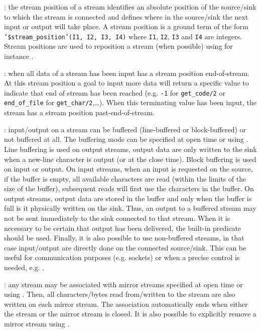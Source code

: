 : the stream position of a stream identifies an
absolute position of the source/sink to which the stream is connected and
defines where in the source/sink the next input or output will take place. A
stream position is a ground term of the form
\texttt{'\$stream\_position'(I1, I2, I3, I4)} where \texttt{I1},
\texttt{I2}, \texttt{I3} and \texttt{I4} are integers. Stream positions are
used to reposition a stream (when possible) using for instance
 .

: when all data of a stream
 has been input  has a stream position
end-of-stream. At this stream position a goal to input more data will return
a specific value to indicate that end of stream has been reached (e.g.
\texttt{-1} for \texttt{get\_code/2} or \texttt{end\_of\_file} for
\texttt{get\_char/2},\ldots). When this terminating value has been input, the
stream has a stream position past-end-of-stream.

: input/output on a stream can be buffered
(line-buffered or block-buffered) or not buffered at all. The buffering mode
can be specified at open time or using 
. Line buffering is used on output streams,
output data are only written to the sink when a new-line character is output
(or at the close time). Block buffering is used on input or output. On input
streams, when an input is requested on the source, if the buffer is empty,
all available characters are read (within the limits of the size of the
buffer), subsequent reads will first use the characters in the buffer. On
output streams, output data are stored in the buffer and only when the
buffer is full is it physically written on the sink. Thus, an output to a
buffered stream may not be sent immediately to the sink connected to that
stream. When it is necessary to be certain that output has been delivered,
the built-in predicate  
should be used. Finally, it is also possible to use non-buffered streams, in
that case input/output are directly done on the connected source/sink. This
can be useful for communication purposes (e.g. sockets) or when a precise
control is needed, e.g.  .

: any stream may be associated with mirror streams
specified at open time or using 
. Then, all characters/bytes read from/written to
the stream are also written on each mirror stream.  The association
automatically ends when either the stream or the mirror stream is closed. It
is also possible to explicitly remove a mirror stream using
.


